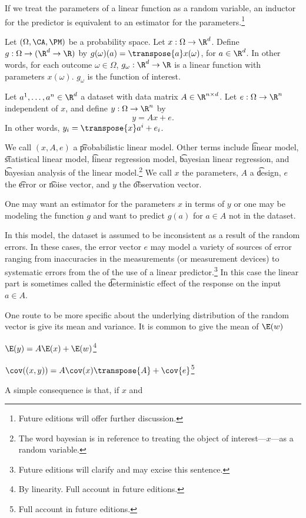 

If we treat the parameters of a linear function as a random variable, an inductor for the predictor is equivalent to an estimator for the parameters.\footnote{Future editions will offer further discussion.}


Let $(\Omega, \CA, \PM)$ be a probability space.
Let $x: \Omega \to \R^d$.
Define $g: \Omega \to (\R^d \to \R)$ by $g(\omega)(a) = \transpose{a}x(\omega)$, for $a \in \R^d$.
In other words, for each outcome $\omega \in \Omega$, $g_\omega: \R^d \to \R$ is a linear function with parameters $x(\omega)$.
$g_\omega$ is the function of interest.

Let $a^1, \dots, a^n \in \R^d$ a dataset with data matrix $A \in \R^{n \times d}$.
Let $e: \Omega \to \R^n$ independent of $x$, and define $y: \Omega \to \R^n$ by
\[
  y = Ax + e.
\]
In other words, $y_i = \transpose{x}a^i + e_i$.

We call $(x, A, e)$ a \t{probabilistic linear model}.
Other terms include \t{linear model}, \t{statistical linear model}, \t{linear regression model}, \t{bayesian linear regression}, and \t{bayesian analysis of the linear model}.\footnote{The word bayesian is in reference to treating the object of interest---$x$---as a random variable.}
We call $x$ the parameters, $A$ a \t{design}, $e$ the \t{error} or \t{noise} vector, and $y$ the \t{observation} vector.

One may want an estimator for the parameters $x$ in terms of $y$ or one may be modeling the function $g$ and want to predict $g(a)$ for $a \in A$ not in the dataset.


In this model, the dataset is assumed to be inconsistent as a result of the random errors.
In these cases, the error vector $e$ may model a variety of sources of error ranging from inaccuracies in the measurements (or measurement devices) to systematic errors from the  of the use of a linear predictor.\footnote{Future editions will clarify and may excise this sentence.}
In this case the linear part is sometimes called the \t{deterministic effect} of the response on the input $a \in A$.


One route to be more specific about the underlying distribution of the random vector is give its mean and variance.
It is common to give the mean of $\E(w)$


\begin{proposition}
  $\E(y) = A\E(x) + \E(w)$\footnote{By linearity. Full account in future editions.}
\end{proposition}

\begin{proposition}
  $\cov((x, y)) = A\cov(x)\transpose{A} + \cov{e}$\footnote{Full account in future editions.}
\end{proposition}

A simple consequence is that, if $x$ and
